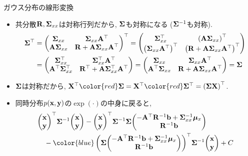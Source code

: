\documentclass[dvipdfmx,notheorems,t]{beamer}
\begin{document}
\begin{frame}{ガウス分布の線形変換}
\begin{itemize}
  \item 共分散$\vb{R}, \vb{\Sigma}_{xx}$は対称行列だから, $\vb{\Sigma}$も対称になる ($\vb{\Sigma}^{-1}$も対称).
  {\small \begin{align*}
    \vb{\Sigma}^\top &= \mqty(\vb{\Sigma}_{xx} & \vb{\Sigma}_{xx} \vb{A}^\top \\
      \vb{A} \vb{\Sigma}_{xx} & \vb{R} + \vb{A} \vb{\Sigma}_{xx} \vb{A}^\top)^\top
    = \mqty(\vb{\Sigma}_{xx}^\top & \left( \vb{A} \vb{\Sigma}_{xx} \right)^\top \\
      \left( \vb{\Sigma}_{xx} \vb{A}^\top \right)^\top &
      \left( \vb{R} + \vb{A} \vb{\Sigma}_{xx} \vb{A}^\top \right)^\top) \\
    &= \mqty(\vb{\Sigma}_{xx}^\top & \vb{\Sigma}_{xx}^\top \vb{A}^\top \\
      \vb{A}^\top \vb{\Sigma}_{xx}^\top &
      \vb{R}^\top + \vb{A} \vb{\Sigma}_{xx}^\top \vb{A}^\top)
    = \mqty(\vb{\Sigma}_{xx} & \vb{\Sigma}_{xx} \vb{A}^\top \\
      \vb{A}^\top \vb{\Sigma}_{xx} &
      \vb{R} + \vb{A} \vb{\Sigma}_{xx} \vb{A}^\top) = \vb{\Sigma}
  \end{align*}}
  \item $\vb{\Sigma}$は対称だから, $\vb{X}^\top {\color{red} \vb{\Sigma}}
    = \vb{X}^\top {\color{red} \vb{\Sigma}^\top} = \left( \vb{\Sigma} \vb{X} \right)^\top$.
  \item 同時分布$p(\vb{x}, \vb{y})$の$\exp(\cdot)$の中身に戻ると,
  {\small \begin{align*}
    & \mqty(\vb{x} \\ \vb{y})^\top \vb{\Sigma}^{-1} \mqty(\vb{x} \\ \vb{y})
      - \mqty(\vb{x} \\ \vb{y})^\top \vb{\Sigma}^{-1} \vb{\Sigma}
      \mqty(-\vb{A}^\top \vb{R}^{-1} \vb{b} + \vb{\Sigma}_{xx}^{-1} \vb*{\mu}_x \\ \vb{R}^{-1} \vb{b}) \\
    & \quad - {\color{blue} \left( \vb{\Sigma}
      \mqty(-\vb{A}^\top \vb{R}^{-1} \vb{b} + \vb{\Sigma}_{xx}^{-1} \vb*{\mu}_x \\ \vb{R}^{-1} \vb{b}) \right)^\top}
      \vb{\Sigma}^{-1} \mqty(\vb{x} \\ \vb{y}) + C
  \end{align*}}
\end{itemize}
\end{frame}
\end{document}
